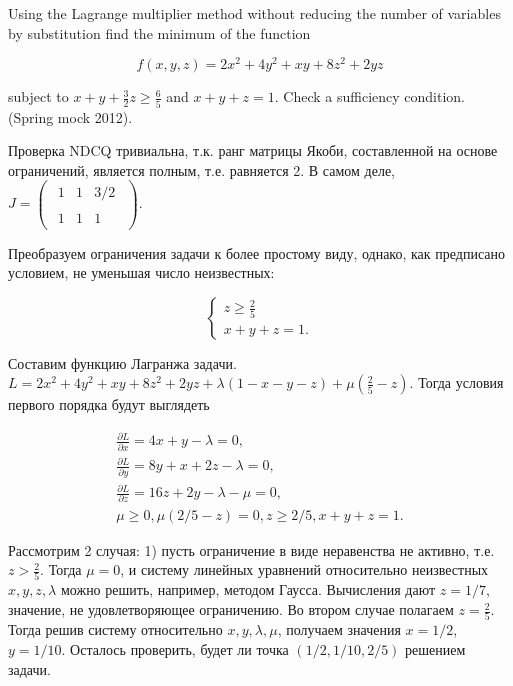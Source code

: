 \begin{problem}
Using the Lagrange multiplier method without reducing the number of variables by substitution find the minimum of the function

\[f(x,y,z)=2x^{2} +4y^{2} +xy+8z^{2} +2yz\]

subject to $x+y+\frac{3}{2} z\ge \frac{6}{5} $ and $x+y+z=1$. Check a sufficiency condition. (Spring mock 2012).


\begin{sol}
Проверка NDCQ тривиальна, т.к. ранг матрицы Якоби, составленной на основе ограничений, является полным, т.е. равняется 2. В самом деле, $J=\left(\begin{array}{c} {\begin{array}{ccc} {1} & {1} & {3/2} \end{array}} \\ {\begin{array}{ccc} {1} & {1} & {1} \end{array}} \end{array}\right)$.

Преобразуем ограничения задачи к более простому виду, однако, как предписано условием, не уменьшая число неизвестных:

\[
\begin{cases}
z\ge \frac{2}{5} \\
x+y+z=1.
\end{cases}
\]

Составим функцию Лагранжа задачи. $L=2x^{2} +4y^{2} +xy+8z^{2} +2yz+\lambda (1-x-y-z)+\mu (\frac{2}{5} -z)$. Тогда условия первого порядка будут выглядеть

\[
\begin{array}{l}
{\frac{\partial L}{\partial x} =4x+y-\lambda =0,} \\
{\frac{\partial L}{\partial y} =8y+x+2z-\lambda =0,} \\
{\frac{\partial L}{\partial z} =16z+2y-\lambda -\mu =0,} \\
{\mu \ge 0,  \mu (2/5-z)=0,  z\ge 2/5,  x+y+z=1.}
\end{array}
\]

Рассмотрим 2 случая: 1) пусть ограничение в виде неравенства не активно, т.е.$z>\frac{2}{5} $. Тогда $\mu =0$, и систему линейных уравнений относительно неизвестных $x,y,z,\lambda $ можно решить, например, методом Гаусса. Вычисления дают $z=1/7$, значение, не удовлетворяющее ограничению. Во втором случае полагаем $z=\frac{2}{5} $. Тогда решив систему относительно $x, y, \lambda, \mu $, получаем значения  $x=1/2$, $ y=1/10$. Осталось проверить, будет ли точка $(1/2,1/10,2/5)$ решением задачи.


\end{sol}
\end{problem}
